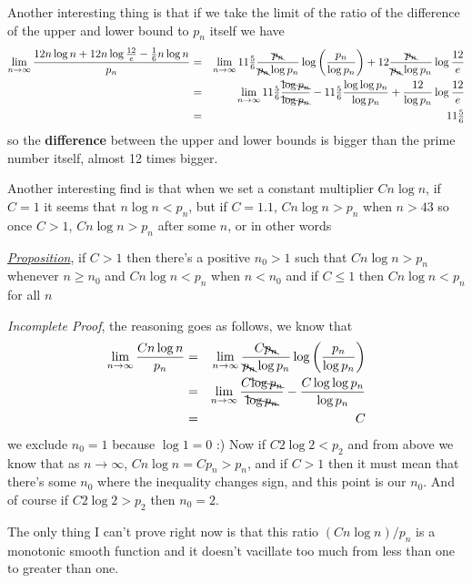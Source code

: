 \documentclass[aps,preprint,preprintnumbers,nofootinbib,showpacs,prd]{revtex4-1}
\newcommand{\nbea}{\begin{eqnarray*}}
\newcommand{\neea}{\end{eqnarray*}}
\begin{document}
Another interesting thing is that if we take the limit of the ratio of the difference of the upper and lower bound to $p_n$ itself we have
%
\nbea
\lim_{n\to\infty} \frac{12 n \log n + 12 n \log\frac{12}{e} - \tfrac{1}{6} n \log n}{p_n} & = & \lim_{n\to\infty} 11\tfrac{5}{6} \frac{\bcancel{p_n}}{\bcancel{p_n}\log p_n} \log \left ( \frac{p_n}{\log p_n}\right ) + 12 \frac{\bcancel{p_n}}{\bcancel{p_n}\log p_n} \log\frac{12}{e} \\
& = & \lim_{n\to\infty} 11\tfrac{5}{6} \frac{\bcancel{\log p_n}}{\bcancel{\log p_n}} - 11\tfrac{5}{6} \frac{\log \log p_n}{\log p_n} + \frac{12}{\log p_n} \log\frac{12}{e} \\
& = & 11\tfrac{5}{6}
\neea
%
so the {\bf difference} between the upper and lower bounds is bigger than the prime number itself, almost 12 times bigger.

Another interesting find is that when we set a constant multiplier $C n\log n$, if $C = 1$ it seems that $n\log n < p_n$, but if $C=1.1$, $C n \log n > p_n$ when $n > 43$ so once $C > 1$, $Cn\log n > p_n$ after some $n$, or in other words

\underline{\textit {Proposition}}, if $C > 1$ then there's a positive $n_0 > 1$ such that $Cn\log n > p_n$ whenever $n \ge n_0$ and $Cn\log n < p_n$ when $n < n_0$ and if $C\le1$ then $C n\log n < p_n$ for all $n$

{\it Incomplete Proof}, the reasoning goes as follows, we know that
%
\nbea
\lim_{n\to\infty}\frac{Cn\log n}{p_n} & = &  \lim_{n\to\infty} \frac{C \bcancel{p_n}}{\bcancel{p_n}\log p_n} \log \left ( \frac{p_n}{\log p_n}\right ) \\
& = & \lim_{n\to\infty} \frac{C \bcancel{\log p_n}}{\bcancel{\log p_n}} - \frac{C \log \log p_n}{\log p_n} \\
& = & C
\neea
%
we exclude $n_0 = 1$ because $\log 1 = 0$ :) Now if $C 2 \log 2 < p_2$ and from above we know that as $n\to\infty$, $Cn\log n = C p_n > p_n$, and if $C > 1$ then it must mean that there's some $n_0$ where the inequality changes sign, and this point is our $n_0$. And of course if $C2 \log 2 > p_2$ then $n_0 = 2$.

The only thing I can't prove right now is that this ratio $(Cn\log n)/p_n$ is a monotonic smooth function and it doesn't vacillate too much from less than one to greater than one.
\end{document}
